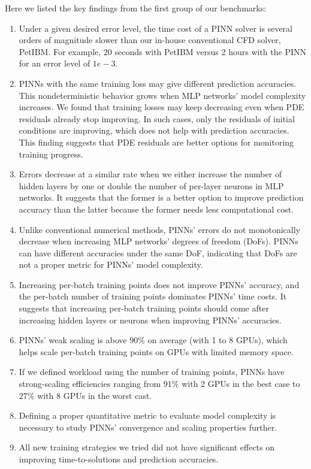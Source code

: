 {Here we listed the key findings from the first group of our benchmarks:
\begin{enumerate}[nolistsep]
    \item Under a given desired error level, the time cost of a PINN solver is several orders of magnitude slower than our in-house conventional CFD solver, PetIBM.
    For example, 20 seconds with PetIBM versus 2 hours with the PINN for an error level of $1e-3$.
    \item PINNs with the same training loss may give different prediction accuracies.
    This nondeterministic behavior grows when MLP networks' model complexity increases.
    We found that training losses may keep decreasing even when PDE residuals already stop improving.
    In such cases, only the residuals of initial conditions are improving, which does not help with prediction accuracies.
    This finding suggests that PDE residuals are better options for monitoring training progress.
    \item Errors decrease at a similar rate when we either increase the number of hidden layers by one or double the number of per-layer neurons in MLP networks.
    It suggests that the former is a better option to improve prediction accuracy than the latter because the former needs less computational cost.
    \item Unlike conventional numerical methods, PINNs' errors do not monotonically decrease when increasing MLP networks' degrees of freedom (DoFs).
    PINNs can have different accuracies under the same DoF, indicating that DoFs are not a proper metric for PINNs' model complexity.
    \item Increasing per-batch training points does not improve PINNs' accuracy, and the per-batch number of training points dominates PINNs' time costs.
    It suggests that increasing per-batch training points should come after increasing hidden layers or neurons when improving PINNs' accuracies.
    \item PINNs' weak scaling is above $90\%$ on average (with 1 to 8 GPUs), which helps scale per-batch training points on GPUs with limited memory space.
    \item If we defined workload using the number of training points, PINNs have strong-scaling efficiencies ranging from $91\%$ with 2 GPUs in the best case to $27\%$ with 8 GPUs in the worst cast.
    \item Defining a proper quantitative metric to evaluate model complexity is necessary to study PINNs' convergence and scaling properties further.
    \item All new training strategies we tried did not have significant effects on improving time-to-solutions and prediction accuracies.
\end{enumerate}

}
